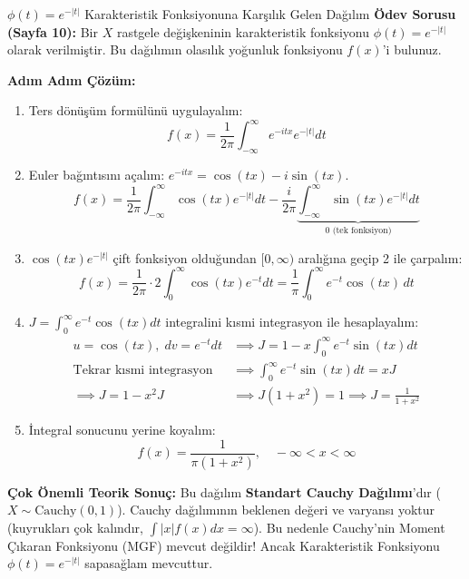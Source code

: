 \documentclass[12pt,a4paper]{article}
\begin{document}
\begin{odev}{$\phi(t) = e^{-|t|}$ Karakteristik Fonksiyonuna Karşılık Gelen Dağılım}
\textbf{Ödev Sorusu (Sayfa 10):} Bir $X$ rastgele değişkeninin karakteristik fonksiyonu $\phi(t) = e^{-|t|}$ olarak verilmiştir. Bu dağılımın olasılık yoğunluk fonksiyonu $f(x)$'i bulunuz.

\bigskip
\textbf{Adım Adım Çözüm:}
\begin{enumerate}
    \item Ters dönüşüm formülünü uygulayalım:
    \begin{equation}
        f(x) = \frac{1}{2\pi} \int_{-\infty}^{\infty} e^{-itx} e^{-|t|} dt
    \end{equation}
    \item Euler bağıntısını açalım: $e^{-itx} = \cos(tx) - i\sin(tx)$.
    \begin{equation}
        f(x) = \frac{1}{2\pi} \int_{-\infty}^{\infty} \cos(tx) e^{-|t|} dt - \frac{i}{2\pi} \underbrace{\int_{-\infty}^{\infty} \sin(tx) e^{-|t|} dt}_{0 \text{ (tek fonksiyon)}}
    \end{equation}
    \item $\cos(tx) e^{-|t|}$ çift fonksiyon olduğundan $[0, \infty)$ aralığına geçip 2 ile çarpalım:
    \begin{equation}
        f(x) = \frac{1}{2\pi} \cdot 2 \int_{0}^{\infty} \cos(tx) e^{-t} dt = \frac{1}{\pi} \int_{0}^{\infty} e^{-t} \cos(tx) \, dt
    \end{equation}
    \item $J = \int_{0}^{\infty} e^{-t} \cos(tx) dt$ integralini kısmi integrasyon ile hesaplayalım:
    \begin{align}
        u = \cos(tx), \; dv = e^{-t}dt &\implies J = 1 - x \int_0^\infty e^{-t}\sin(tx) dt \\
        \text{Tekrar kısmi integrasyon} &\implies \int_0^\infty e^{-t}\sin(tx) dt = x J \\
        \implies J = 1 - x^2 J &\implies J(1 + x^2) = 1 \implies J = \frac{1}{1 + x^2}
    \end{align}
    \item İntegral sonucunu yerine koyalım:
    \begin{equation}
        \boxed{f(x) = \frac{1}{\pi (1 + x^2)}, \quad -\infty < x < \infty}
    \end{equation}
\end{enumerate}
\textbf{Çok Önemli Teorik Sonuç:} Bu dağılım \textbf{Standart Cauchy Dağılımı}'dır ($X \sim \text{Cauchy}(0,1)$).  
Cauchy dağılımının beklenen değeri ve varyansı yoktur (kuyrukları çok kalındır, $\int |x|f(x)dx = \infty$). Bu nedenle Cauchy'nin Moment Çıkaran Fonksiyonu (MGF) mevcut değildir! Ancak Karakteristik Fonksiyonu $\phi(t) = e^{-|t|}$ sapasağlam mevcuttur.
\end{odev}
\end{document}
